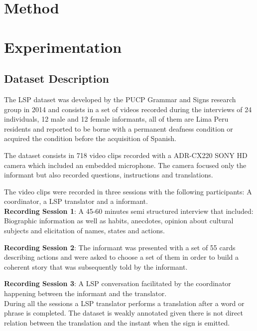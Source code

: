 \documentclass[twocolumn]{article}
\begin{document}
\section{Method}\label{method}
\section{Experimentation}\label{experimentation}
\subsection{Dataset Description \cite{lsp_dataset}}\label{datasetdesc}
The LSP dataset was developed by the PUCP Grammar and Signs research group in 2014 and consists in a set of videos recorded during the interviews of 24 individuals, 12 male and 12 female informants, all of them are Lima Peru residents and reported to be borne with a permanent deafness condition or acquired the condition before the acquisition of Spanish. 

The dataset consists in 718 video clips recorded with a ADR-CX220 SONY HD camera which included an embedded microphone. The camera focused only the informant but also recorded questions, instructions and translations.

The video clips were recorded in three sessions with the following participants: A coordinator, a LSP \cite{lsp_2015} translator and a informant.\\

\textbf{Recording Session 1}: A 45-60 minutes semi structured interview that included: Biographic information as well as habits, anecdotes, opinion about cultural subjects and elicitation of names, states and actions. 

\textbf{Recording Session 2}: The informant was presented with a set of 55 cards describing actions and were asked to choose a set of them in order to build a coherent story that was subsequently told by the informant.

\textbf{Recording Session 3}: A LSP \cite{lsp_2015} conversation facilitated by the coordinator happening between the informant and the translator.\\

During all the sessions a LSP \cite{lsp_2015} translator performs a translation after a word or phrase is completed. The dataset is weakly annotated given there is not direct relation between the translation and the instant when the sign is emitted.
\end{document}
